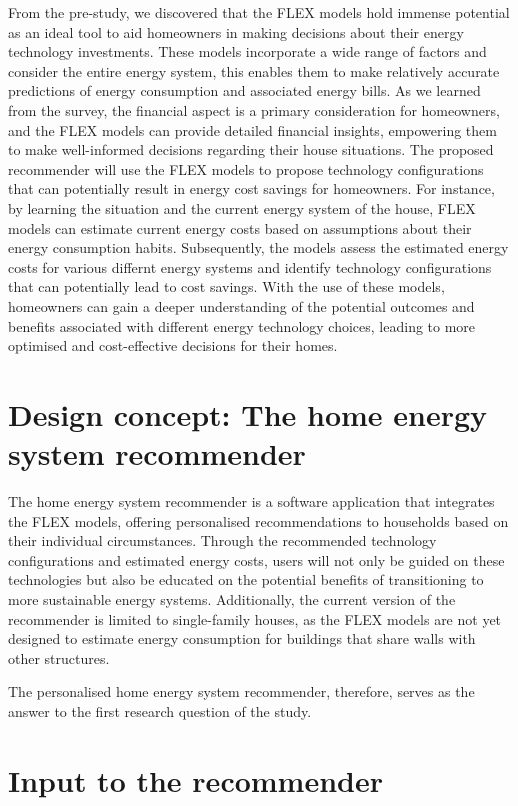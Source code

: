 From the pre-study, we discovered that the FLEX models hold immense potential as an ideal tool to aid homeowners in making decisions about their energy technology investments. 
These models incorporate a wide range of factors and consider the entire energy system, 
this enables them to make relatively accurate predictions of energy consumption and associated energy bills. 
As we learned from the survey, the financial aspect is a primary consideration for homeowners, 
and the FLEX models can provide detailed financial insights, empowering them to make well-informed decisions regarding their house situations.
The proposed recommender will use the FLEX models to propose technology configurations that can potentially result in energy cost savings for homeowners. 
For instance, by learning the situation and the current energy system of the house, FLEX models can estimate current energy costs based on assumptions about their energy consumption habits. 
Subsequently, the models assess the estimated energy costs for various differnt energy systems and identify technology configurations that can potentially lead to cost savings. 
With the use of these models, homeowners can gain a deeper understanding of the potential outcomes and benefits associated with different energy technology choices, leading to more optimised and cost-effective decisions for their homes.


\section{Design concept: The home energy system recommender}

The home energy system recommender is a software application that integrates the FLEX models,
offering personalised recommendations to households based on their individual circumstances.
Through the recommended technology configurations and estimated energy costs, 
users will not only be guided on these technologies but also be educated on the potential benefits of transitioning to more sustainable energy systems. 
Additionally, the current version of the recommender is limited to single-family houses, as the FLEX models are not yet designed to estimate energy consumption for buildings that share walls with other structures. 

The personalised home energy system recommender, therefore, serves as the answer to the first research question of the study. 


\section{Input to the recommender}


